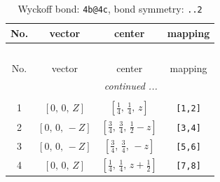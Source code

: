 \documentclass[fleqn,8pt]{jsarticle}
\begin{document}
\renewcommand{\arraystretch}{1.2}
\begin{longtable}{cccc}
\caption{Wyckoff bond: {\tt 4b@4c}, bond symmetry: {\tt ..2}}
 \\
 \hline \hline
No. & vector & center & mapping \\ \hline \endfirsthead

\multicolumn{3}{l}{\tablename\ \thetable{}} \\
 \hline \hline
No. & vector & center & mapping \\ \hline \endhead

 \hline \hline
\multicolumn{3}{r}{\footnotesize\it continued ...} \\ \endfoot

 \hline \hline
\multicolumn{3}{r}{} \\ \endlastfoot

1 & $\left[ 0,\, 0,\, Z \right]$ & $\left[ \frac{1}{4},\, \frac{1}{4},\, z \right]$ & {\tt [1,2]} \\ \hline
2 & $\left[ 0,\, 0,\, - Z \right]$ & $\left[ \frac{3}{4},\, \frac{3}{4},\, \frac{1}{2} - z \right]$ & {\tt [3,4]} \\ \hline
3 & $\left[ 0,\, 0,\, - Z \right]$ & $\left[ \frac{3}{4},\, \frac{3}{4},\, - z \right]$ & {\tt [5,6]} \\ \hline
4 & $\left[ 0,\, 0,\, Z \right]$ & $\left[ \frac{1}{4},\, \frac{1}{4},\, z + \frac{1}{2} \right]$ & {\tt [7,8]} \\
\end{longtable}
\renewcommand{\arraystretch}{1.2}
\end{document}

